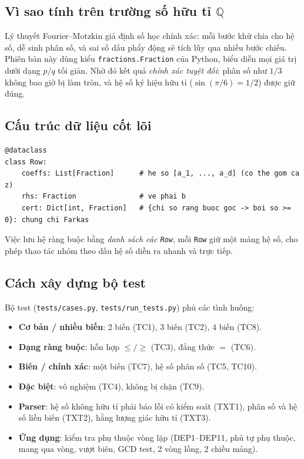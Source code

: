 \documentclass[12pt,a4paper]{article}
\theoremstyle{definition}
\newcommand{\Q}{\mathbb{Q}}
\begin{document}
\subsection{Vì sao tính trên trường số hữu tỉ \texorpdfstring{$\Q$}{Q}}

Lý thuyết Fourier--Motzkin giả định số học chính xác: mỗi bước khử chia cho hệ
số, dễ sinh phân số, và sai số dấu phẩy động sẽ tích lũy qua nhiều bước chiếu.
Phiên bản này dùng kiểu \texttt{fractions.Fraction} của Python, biểu diễn mọi
giá trị dưới dạng $p/q$ tối giản. Nhờ đó kết quả \emph{chính xác tuyệt đối}:
phân số như $1/3$ không bao giờ bị làm tròn, và hệ số ký hiệu hữu tỉ
($\sin(\pi/6) = 1/2$) được giữ đúng.

\subsection{Cấu trúc dữ liệu cốt lõi}

\begin{lstlisting}[caption={Lớp Row - một bất đẳng thức kèm chứng chỉ Farkas (fmlp/model.py)}]
@dataclass
class Row:
    coeffs: List[Fraction]      # he so [a_1, ..., a_d] (co the gom ca z)
    rhs: Fraction               # ve phai b
    cert: Dict[int, Fraction]   # {chi so rang buoc goc -> boi so >= 0}: chung chi Farkas
\end{lstlisting}

Việc lưu hệ ràng buộc bằng \emph{danh sách các \texttt{Row}}, mỗi \texttt{Row}
giữ một mảng hệ số, cho phép thao tác nhóm theo dấu hệ số diễn ra nhanh và
trực tiếp.

\subsection{Cách xây dựng bộ test}
\label{sec:tests}

Bộ test (\texttt{tests/cases.py}, \texttt{tests/run\_tests.py}) phủ các tình
huống:
\begin{itemize}
    \item \textbf{Cơ bản / nhiều biến}: 2 biến (TC1), 3 biến (TC2), 4 biến (TC8).
    \item \textbf{Dạng ràng buộc}: hỗn hợp $\le/\ge$ (TC3), đẳng thức $=$ (TC6).
    \item \textbf{Biên / chính xác}: một biến (TC7), hệ số phân số (TC5, TC10).
    \item \textbf{Đặc biệt}: vô nghiệm (TC4), không bị chặn (TC9).
    \item \textbf{Parser}: hệ số không hữu tỉ phải báo lỗi có kiểm soát (TXT1),
          phân số và hệ số liền biến (TXT2), hằng lượng giác hữu tỉ (TXT3).
    \item \textbf{Ứng dụng}: kiểm tra phụ thuộc vòng lặp (DEP1--DEP11, phủ tự phụ thuộc, mang qua vòng, vượt biên, GCD test, 2 vòng lồng, 2 chiều mảng).
\end{itemize}
\end{document}
